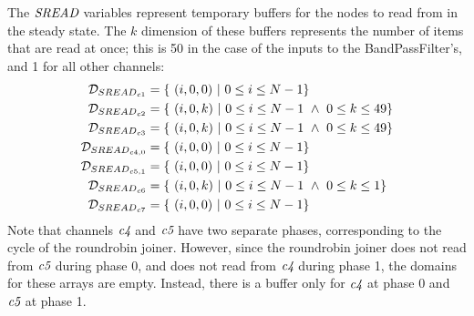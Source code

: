 
The $\mbox{\it SREAD}$ variables represent temporary buffers for the nodes
to read from in the steady state.  The $k$ dimension of these buffers
represents the number of items that are read at once; this is 50 in
the case of the inputs to the BandPassFilter's, and 1 for all other
channels:
\begin{align*}
{\cal D}_{{SREAD}_{c1}} &= \{~(i,0,0)~|~0 \le i \le N-1\} \\
{\cal D}_{{SREAD}_{c2}} &= \{~(i,0,k)~|~0 \le i \le N-1 ~\wedge~ 0 \le k \le 49\} \\
{\cal D}_{{SREAD}_{c3}} &= \{~(i,0,k)~|~0 \le i \le N-1 ~\wedge~ 0 \le k \le 49\} \\
{\cal D}_{{SREAD}_{{c4}, 0}} &= \{~(i,0,0)~|~0 \le i \le N-1 \} \\
{\cal D}_{{SREAD}_{{c5}, 1}} &= \{~(i,0,0)~|~0 \le i \le N-1 \} \\
{\cal D}_{{SREAD}_{c6}} &= \{~(i,0,k)~|~0 \le i \le N-1 ~\wedge~ 0 \le k \le 1 \} \\
{\cal D}_{{SREAD}_{c7}} &= \{~(i,0,0)~|~0 \le i \le N-1\}
\end{align*}
Note that channels $\mbox{\it c4}$ and $\mbox{\it c5}$ have two separate phases,
corresponding to the cycle of the roundrobin joiner.  However, since
the roundrobin joiner does not read from $\mbox{\it c5}$ during phase 0, and
does not read from $\mbox{\it c4}$ during phase 1, the domains for these
arrays are empty.  Instead, there is a buffer only for $\mbox{\it c4}$ at
phase 0 and $\mbox{\it c5}$ at phase 1.




